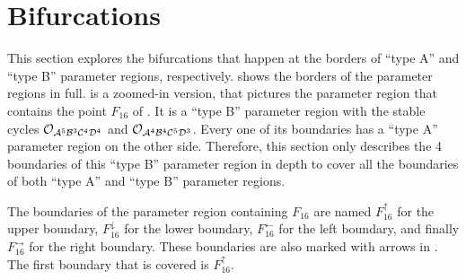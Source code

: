 \section{Bifurcations}
\label{sec:arch.bif}

This section explores the bifurcations that happen at the borders of ``type A'' and ``type B'' parameter regions, respectively.
 shows the borders of the parameter regions in full.
 is a zoomed-in version, that pictures the parameter region that contains the point $F_{16}$ of .
It is a ``type B'' parameter region with the stable cycles $\mathcal{O}_{\mathcal{A}^5\mathcal{B}^3\mathcal{C}^4\mathcal{D}^4}$ and $\mathcal{O}_{\mathcal{A}^4\mathcal{B}^4\mathcal{C}^5\mathcal{D}^3}$.
Every one of its boundaries has a ``type A'' parameter region on the other side.
Therefore, this section only describes the 4 boundaries of this ``type B'' parameter region in depth to cover all the boundaries of both ``type A'' and ``type B'' parameter regions.

The boundaries of the parameter region containing $F_{16}$ are named $F_{16}^\uparrow$ for the upper boundary, $F_{16}^\downarrow$ for the lower boundary, $F_{16}^\leftarrow$ for the left boundary, and finally $F_{16}^\rightarrow$ for the right boundary.
These boundaries are also marked with arrows in .
The first boundary that is covered is $F_{16}^\uparrow$.

